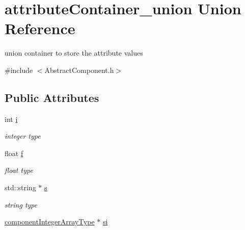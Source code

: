 \hypertarget{unionattribute_container__union}{\section{attribute\-Container\-\_\-union Union Reference}
\label{dd/d8b/unionattribute_container__union}
}


union container to store the attribute values  




{\ttfamily \#include $<$Abstract\-Component.\-h$>$}

\subsection*{Public Attributes}
\begin{DoxyCompactItemize}
\item 
\hypertarget{unionattribute_container__union_a8ccd0904a303e6b5df3358f7847ccc32}{int \hyperlink{unionattribute_container__union_a8ccd0904a303e6b5df3358f7847ccc32}{i}}\label{dd/d8b/unionattribute_container__union_a8ccd0904a303e6b5df3358f7847ccc32}

\begin{DoxyCompactList}\small\item\em integer type \end{DoxyCompactList}\item 
\hypertarget{unionattribute_container__union_a8b7fa07f036da8f8590ffde9cce25562}{float \hyperlink{unionattribute_container__union_a8b7fa07f036da8f8590ffde9cce25562}{f}}\label{dd/d8b/unionattribute_container__union_a8b7fa07f036da8f8590ffde9cce25562}

\begin{DoxyCompactList}\small\item\em float type \end{DoxyCompactList}\item 
\hypertarget{unionattribute_container__union_a739b5d76690df93b19380a78cb7ddbd3}{std\-::string $\ast$ \hyperlink{unionattribute_container__union_a739b5d76690df93b19380a78cb7ddbd3}{s}}\label{dd/d8b/unionattribute_container__union_a739b5d76690df93b19380a78cb7ddbd3}

\begin{DoxyCompactList}\small\item\em string type \end{DoxyCompactList}\item 
\hypertarget{unionattribute_container__union_a2b29c846194a2339949b09868796eebe}{\hyperlink{_abstract_component_8h_a8bf1376a7e433919172c6631520f34b4}{component\-Integer\-Array\-Type} $\ast$ \hyperlink{unionattribute_container__union_a2b29c846194a2339949b09868796eebe}{si}}\label{dd/d8b/unionattribute_container__union_a2b29c846194a2339949b09868796eebe}


\end{DoxyCompactItemize}
